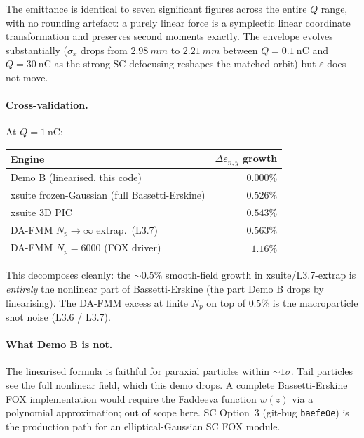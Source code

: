 \documentclass[11pt]{article}
\begin{document}
The emittance is identical to seven significant figures across the
entire $Q$ range, with no rounding artefact: a purely linear force is
a symplectic linear coordinate transformation and preserves second
moments exactly. The envelope evolves substantially ($\sigma_x$ drops
from $\SI{2.98}{mm}$ to $\SI{2.21}{mm}$ between $Q=\SI{0.1}{\nano\coulomb}$
and $Q=\SI{30}{\nano\coulomb}$ as the strong SC defocusing reshapes
the matched orbit) but $\varepsilon$ does not move.

\paragraph{Cross-validation.}
At $Q=\SI{1}{\nano\coulomb}$:

\begin{table}[h]
\centering
\begin{tabular}{lr}
\toprule
Engine & $\Delta\varepsilon_{n,y}$ growth \\
\midrule
Demo B (linearised, this code)              & $0.000\%$ \\
xsuite frozen-Gaussian (full Bassetti-Erskine) & $0.526\%$ \\
xsuite 3D PIC                                & $0.543\%$ \\
DA-FMM $N_p\!\to\!\infty$ extrap.\ (L3.7)    & $0.563\%$ \\
DA-FMM $N_p=6000$ (FOX driver)               & $1.16\%$ \\
\bottomrule
\end{tabular}
\end{table}

This decomposes cleanly: the $\sim 0.5\%$ smooth-field growth in
xsuite/L3.7-extrap is \emph{entirely} the nonlinear part of
Bassetti-Erskine (the part Demo B drops by linearising). The DA-FMM
excess at finite $N_p$ on top of $0.5\%$ is the macroparticle shot
noise (L3.6 / L3.7).

\paragraph{What Demo B is not.}
The linearised formula is faithful for paraxial particles within
$\sim 1\sigma$. Tail particles see the full nonlinear field, which
this demo drops. A complete Bassetti-Erskine FOX implementation would
require the Faddeeva function $w(z)$ via a polynomial approximation;
out of scope here. SC Option~3 (git-bug \texttt{baefe0e}) is the
production path for an elliptical-Gaussian SC FOX module.
\end{document}
